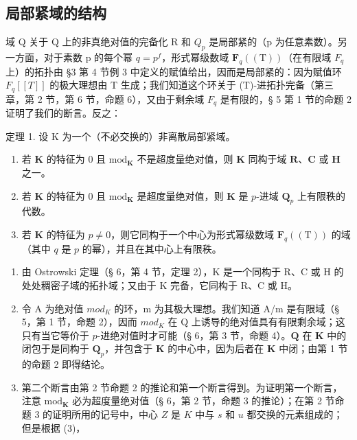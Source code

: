 \subsection{局部紧域的结构}

域 Q 关于 Q 上的非真绝对值的完备化 R 和 \(Q_{p}\) 是局部紧的（p 为任意素数）。另一方面，对于素数 p 的每个幂 \(q = p^{f}\)，形式幂级数域 \(\mathbf{F}_{q}((\mathrm{T}))\)（在有限域 \(F_{q}\) 上）的拓扑由 §3 第 4 节例 3 中定义的赋值给出，因而是局部紧的：因为赋值环 \(F_{q}[[T]]\) 的极大理想由 T 生成；我们知道这个环关于 (T)-进拓扑完备（第三章，第 2 节，第 6 节，命题 6），又由于剩余域 \(F_{q}\) 是有限的，§ 5 第 1 节的命题 2 证明了我们的断言。反之：

定理 1. 设 K 为一个（不必交换的）非离散局部紧域。

\begin{enumerate}
\def\labelenumi{(\roman{enumi})}
\item
  若 \(\mathbf{K}\) 的特征为 0 且 \(\mathrm{mod}_{\mathbf{K}}\) 不是超度量绝对值，则 \(\mathbf{K}\) 同构于域 \(\mathbf{R}\)、\(\mathbf{C}\) 或 \(\mathbf{H}\) 之一。
\item
  若 \(\mathbf{K}\) 的特征为 0 且 \(\mathrm{mod}_{\mathbf{K}}\) 是超度量绝对值，则 \(\mathbf{K}\) 是 \(p\)-进域 \(\mathbf{Q}_p\) 上有限秩的代数。
\item
  若 \(\mathbf{K}\) 的特征为 \(p \neq 0\)，则它同构于一个中心为形式幂级数域 \(\mathbf{F}_q((\mathrm{T}))\) 的域（其中 \(q\) 是 \(p\) 的幂），并且在其中心上有限秩。
\end{enumerate}

\begin{enumerate}
\def\labelenumi{(\roman{enumi})}
\item
由 Ostrowski 定理（§ 6，第 4 节，定理 2），K 是一个同构于 R、C 或 H 的处处稠密子域的拓扑域；又由于 K 完备，它同构于 R、C 或 H。
\item
  令 A 为绝对值 \(mod_{K}\) 的环，m 为其极大理想。我们知道 A/m 是有限域（§ 5，第 1 节，命题 2），因而 \(mod_{K}\) 在 Q 上诱导的绝对值具有有限剩余域；这只有当它等价于 \(p\)-进绝对值时才可能（§ 6，第 3 节，命题 4）。\(\mathbf{Q}\) 在 \(\mathbf{K}\) 中的闭包于是同构于 \(\mathbf{Q}_p\)，并包含于 \(\mathbf{K}\) 的中心中，因为后者在 \(\mathbf{K}\) 中闭；由第 1 节的命题 2 即得结论。
\item
  第二个断言由第 2 节命题 2 的推论和第一个断言得到。为证明第一个断言，注意 \(\mathrm{mod}_{\mathbf{K}}\) 必为超度量绝对值（§ 6，第 2 节，命题 3 的推论）；在第 2 节命题 3 的证明所用的记号中，中心 \(Z\) 是 \(K\) 中与 \(s\) 和 \(u\) 都交换的元素组成的；但是根据 (3)，
\end{enumerate}

